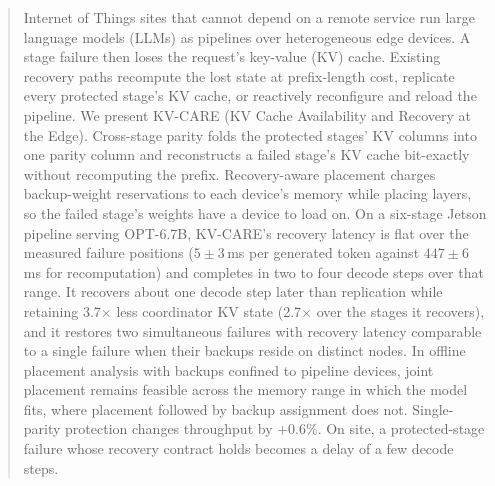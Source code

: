 \begin{abstract}
Internet of Things sites that cannot depend on a remote service run large
language models (LLMs) as pipelines over heterogeneous edge devices.  A stage failure then loses the request's key-value (KV)
cache.  Existing recovery paths recompute the lost state at prefix-length
cost, replicate every protected stage's KV cache, or reactively reconfigure
and reload the pipeline.  We present KV-CARE (KV Cache Availability
and Recovery at the Edge).  Cross-stage parity folds the protected stages'
KV columns into one parity column and reconstructs a failed stage's KV cache bit-exactly without recomputing the
prefix.  Recovery-aware placement charges backup-weight reservations to each
device's memory while placing layers, so the failed stage's weights have a
device to load on.  On a six-stage Jetson pipeline serving OPT-6.7B,
KV-CARE's recovery latency is flat over the measured failure positions
($5\pm3$\,ms per generated token against $447\pm6$\,ms for recomputation)
and completes in two to four decode steps over that range.  It recovers
about one decode step later than replication while retaining 3.7$\times$
less coordinator KV state (2.7$\times$ over the stages it recovers), and it
restores two simultaneous failures with recovery latency comparable to a
single failure when their backups reside on distinct nodes.  In offline
placement analysis with backups confined to pipeline devices, joint
placement remains feasible across the memory range in which the model fits,
where placement followed by backup assignment does not.  Single-parity
protection changes throughput by $+0.6$\%.  On site, a protected-stage
failure whose recovery contract holds becomes a delay of a few decode steps.
\end{abstract}
